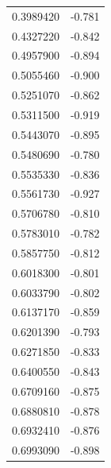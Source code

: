 \documentclass[number, sort&compress, review, 12pt]{elsarticle}
\begin{document}
\begin{longtable}{rr}
0.3989420 & -0.781\\
0.4327220 & -0.842\\
0.4957900 & -0.894\\
0.5055460 & -0.900\\
0.5251070 & -0.862\\
0.5311500 & -0.919\\
0.5443070 & -0.895\\
0.5480690 & -0.780\\
0.5535330 & -0.836\\
0.5561730 & -0.927\\
0.5706780 & -0.810\\
0.5783010 & -0.782\\
0.5857750 & -0.812\\
0.6018300 & -0.801\\
0.6033790 & -0.802\\
0.6137170 & -0.859\\
0.6201390 & -0.793\\
0.6271850 & -0.833\\
0.6400550 & -0.843\\
0.6709160 & -0.875\\
0.6880810 & -0.878\\
0.6932410 & -0.876\\
0.6993090 & -0.898\\
\end{longtable}
\end{document}
